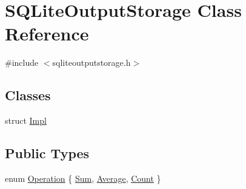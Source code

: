 \hypertarget{class_s_q_lite_output_storage}{}\section{S\+Q\+Lite\+Output\+Storage Class Reference}
\label{class_s_q_lite_output_storage}


{\ttfamily \#include $<$sqliteoutputstorage.\+h$>$}

\subsection*{Classes}
\begin{DoxyCompactItemize}
\item 
struct \mbox{\hyperlink{struct_s_q_lite_output_storage_1_1_impl}{Impl}}
\end{DoxyCompactItemize}
\subsection*{Public Types}
\begin{DoxyCompactItemize}
\item 
enum \mbox{\hyperlink{class_s_q_lite_output_storage_aa3928d8e7ab04aafef854a63a94222eb}{Operation}} \{ \mbox{\hyperlink{class_s_q_lite_output_storage_aa3928d8e7ab04aafef854a63a94222ebab8b1f4b524e0a85b91a4f9f4ef81c05e}{Sum}}, 
\mbox{\hyperlink{class_s_q_lite_output_storage_aa3928d8e7ab04aafef854a63a94222ebaa2a9b954b647d8f5136d242018c342aa}{Average}}, 
\mbox{\hyperlink{class_s_q_lite_output_storage_aa3928d8e7ab04aafef854a63a94222ebaeeda5e71a994454d7b3412f17e1e027c}{Count}}
 \}
\end{DoxyCompactItemize}

